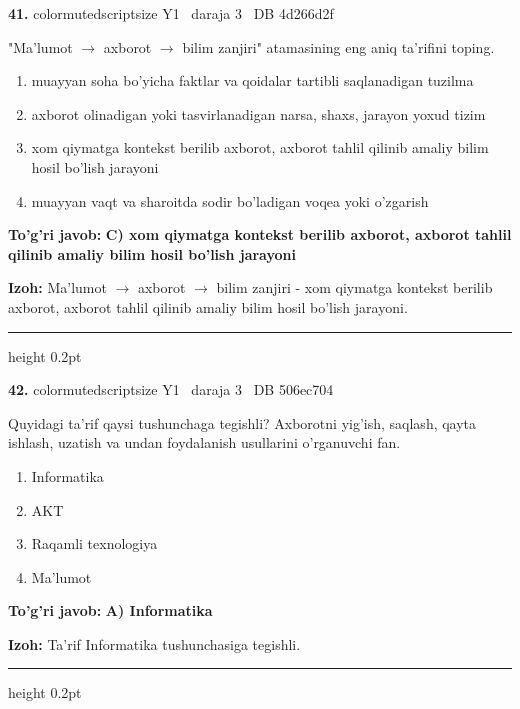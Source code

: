 \documentclass[10pt,a4paper,oneside]{article}
\begin{document}
\noindent\textbf{\color{ink}41.}  {color{muted}scriptsize Y1 \textbullet\ daraja 3 \textbullet\ DB 4d266d2f}
\par
"Ma'lumot \ensuremath{\to} axborot \ensuremath{\to} bilim zanjiri" atamasining eng aniq ta'rifini toping.
\begin{enumerate}[label=\Alph*),leftmargin=9mm]
\item muayyan soha bo'yicha faktlar va qoidalar tartibli saqlanadigan tuzilma
\item axborot olinadigan yoki tasvirlanadigan narsa, shaxs, jarayon yoxud tizim
\item xom qiymatga kontekst berilib axborot, axborot tahlil qilinib amaliy bilim hosil bo'lish jarayoni
\item muayyan vaqt va sharoitda sodir bo'ladigan voqea yoki o'zgarish
\end{enumerate}
\begin{tcolorbox}[enhanced,breakable,colback=teal!4,colframe=teal!50!black,boxrule=0.5pt,arc=1.1mm,left=3mm,right=3mm,top=1.7mm,bottom=1.7mm,before skip=2mm,after skip=2mm]
\textbf{\color{teal}To'g'ri javob:} \textbf{C) xom qiymatga kontekst berilib axborot, axborot tahlil qilinib amaliy bilim hosil bo'lish jarayoni}
\par\smallskip
\textbf{Izoh:} Ma'lumot \ensuremath{\to} axborot \ensuremath{\to} bilim zanjiri - xom qiymatga kontekst berilib axborot, axborot tahlil qilinib amaliy bilim hosil bo'lish jarayoni.
\end{tcolorbox}
\vspace{2mm}\hrule height 0.2pt \vspace{3mm}

\noindent\textbf{\color{ink}42.}  {color{muted}scriptsize Y1 \textbullet\ daraja 3 \textbullet\ DB 506ec704}
\par
Quyidagi ta'rif qaysi tushunchaga tegishli? Axborotni yig'ish, saqlash, qayta ishlash, uzatish va undan foydalanish usullarini o'rganuvchi fan.
\begin{enumerate}[label=\Alph*),leftmargin=9mm]
\item Informatika
\item AKT
\item Raqamli texnologiya
\item Ma'lumot
\end{enumerate}
\begin{tcolorbox}[enhanced,breakable,colback=teal!4,colframe=teal!50!black,boxrule=0.5pt,arc=1.1mm,left=3mm,right=3mm,top=1.7mm,bottom=1.7mm,before skip=2mm,after skip=2mm]
\textbf{\color{teal}To'g'ri javob:} \textbf{A) Informatika}
\par\smallskip
\textbf{Izoh:} Ta'rif Informatika tushunchasiga tegishli.
\end{tcolorbox}
\vspace{2mm}\hrule height 0.2pt \vspace{3mm}
\end{document}
